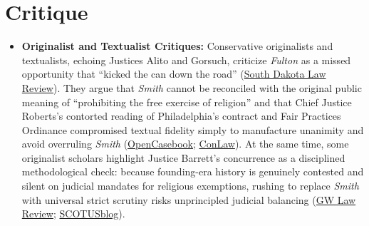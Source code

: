 \documentclass[12pt]{article}
\begin{document}
\section{Critique}
\begin{itemize}
    \item \textbf{Originalist and Textualist Critiques:} Conservative originalists and textualists, echoing Justices Alito and Gorsuch, criticize \textit{Fulton} as a missed opportunity that ``kicked the can down the road'' (\href{https://red.library.usd.edu/cgi/viewcontent.cgi?article=1102&context=sdlrev}{South Dakota Law Review}). They argue that \textit{Smith} cannot be reconciled with the original public meaning of ``prohibiting the free exercise of religion'' and that Chief Justice Roberts's contorted reading of Philadelphia's contract and Fair Practices Ordinance compromised textual fidelity simply to manufacture unanimity and avoid overruling \textit{Smith} (\href{https://opencasebook.org/casebooks/4501-constitutional-law/resources/12.9-fulton-v-city-of-philadelphia-2020/}{OpenCasebook}; \href{https://con.law/print-articles/dwyer-smiths-last-stand-foster-care}{ConLaw}). At the same time, some originalist scholars highlight Justice Barrett's concurrence as a disciplined methodological check: because founding-era history is genuinely contested and silent on judicial mandates for religious exemptions, rushing to replace \textit{Smith} with universal strict scrutiny risks unprincipled judicial balancing (\href{https://www.gwlr.org/two-surprises-in-fulton-v-city-of-philadelphia/}{GW Law Review}; \href{https://www.scotusblog.com/2021/06/court-requires-religious-exemption-but-leaves-many-questions-unanswered/}{SCOTUSblog}).

\end{itemize}
\end{document}
